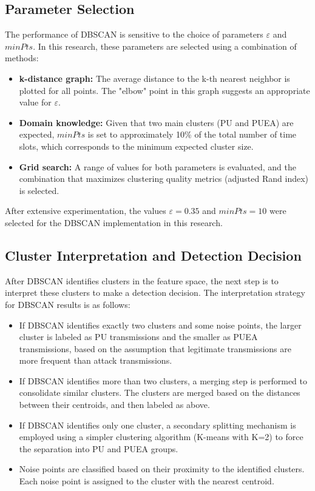 \subsection{Parameter Selection}

The performance of DBSCAN is sensitive to the choice of parameters $\varepsilon$ and $minPts$. In this research, these parameters are selected using a combination of methods:

\begin{itemize}
    \item \textbf{k-distance graph:} The average distance to the k-th nearest neighbor is plotted for all points. The "elbow" point in this graph suggests an appropriate value for $\varepsilon$.
    
    \item \textbf{Domain knowledge:} Given that two main clusters (PU and PUEA) are expected, $minPts$ is set to approximately 10\% of the total number of time slots, which corresponds to the minimum expected cluster size.
    
    \item \textbf{Grid search:} A range of values for both parameters is evaluated, and the combination that maximizes clustering quality metrics (adjusted Rand index) is selected.
\end{itemize}

After extensive experimentation, the values $\varepsilon = 0.35$ and $minPts = 10$ were selected for the DBSCAN implementation in this research.

\subsection{Cluster Interpretation and Detection Decision}

After DBSCAN identifies clusters in the feature space, the next step is to interpret these clusters to make a detection decision. The interpretation strategy for DBSCAN results is as follows:

\begin{itemize}
    \item If DBSCAN identifies exactly two clusters and some noise points, the larger cluster is labeled as PU transmissions and the smaller as PUEA transmissions, based on the assumption that legitimate transmissions are more frequent than attack transmissions.
    
    \item If DBSCAN identifies more than two clusters, a merging step is performed to consolidate similar clusters. The clusters are merged based on the distances between their centroids, and then labeled as above.
    
    \item If DBSCAN identifies only one cluster, a secondary splitting mechanism is employed using a simpler clustering algorithm (K-means with K=2) to force the separation into PU and PUEA groups.
    
    \item Noise points are classified based on their proximity to the identified clusters. Each noise point is assigned to the cluster with the nearest centroid.
\end{itemize}

